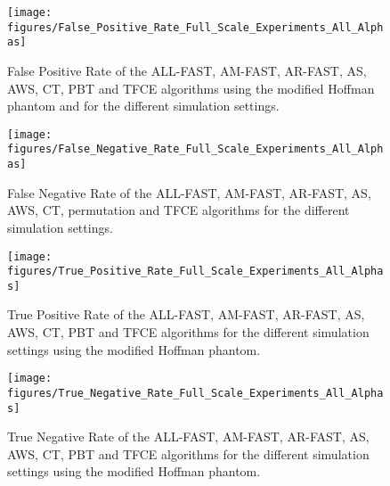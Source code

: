 \begin{figure}
\begin{center}
\texttt{[image: figures/False\_Positive\_Rate\_Full\_Scale\_Experiments\_All\_Alphas]}
\caption[FalsePositive]{False Positive Rate of the ALL-FAST, AM-FAST, AR-FAST,
  AS, AWS, CT, PBT and TFCE algorithms using the modified Hoffman
  phantom and for the different simulation settings.}
  \label{fig:FalsePositive.complete}
\end{center}
\end{figure}
\begin{figure*}[!h]
\begin{center}
\texttt{[image: figures/False\_Negative\_Rate\_Full\_Scale\_Experiments\_All\_Alphas]}
\caption[FalseNegative]{False Negative Rate of the ALL-FAST, AM-FAST, AR-FAST, AS, AWS, CT, permutation and TFCE algorithms for the different simulation settings.}
  \label{fig:FalseNegative.complete}
\end{center}
\end{figure*}
\begin{figure}
\begin{center}
\texttt{[image: figures/True\_Positive\_Rate\_Full\_Scale\_Experiments\_All\_Alphas]}
\caption[TruePositive]{True Positive Rate of the ALL-FAST, AM-FAST, AR-FAST, AS,
  AWS, CT, PBT and TFCE algorithms for the different simulation
  settings using the modified Hoffman phantom.}
  \label{fig:TruePositive.complete}
\end{center}
\end{figure}
\begin{figure}
\begin{center}
\texttt{[image: figures/True\_Negative\_Rate\_Full\_Scale\_Experiments\_All\_Alphas]}
\caption[TruePositive]{True Negative Rate of the ALL-FAST, AM-FAST, AR-FAST, AS,
  AWS, CT, PBT and TFCE algorithms for the different simulation
  settings using the modified Hoffman phantom.}
  \label{fig:TrueNegative.complete}
\end{center}
\end{figure}
\newpage
